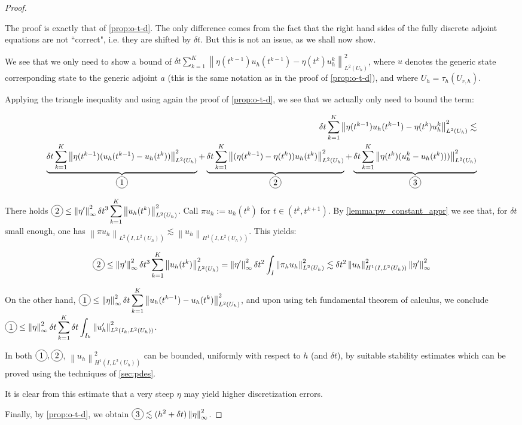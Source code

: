 \documentclass[english,a4paper,9pt,oneside]{scrbook}	%
\theoremstyle{break}
\newenvironment{mproof}[1][\proofname]{%
  \begin{proof}[#1]$ $\par\nobreak\ignorespaces
}{%
  \end{proof}
}
\renewcommand*{\proofname}{Proof}
\theoremstyle{remark}
\newcommand{\ds}{\displaystyle}
\newcommand{\norm}[1]{\left\lVert#1\right\rVert}
\newcommand*\circled[1]{\tikz[baseline=(char.base)]{
            \node[shape=circle,draw,inner sep=2pt] (char) {#1};}}
\begin{document}
\begin{mproof}
The proof is exactly that of \cref{prop:o-t-d}. The only difference comes from the fact that the right hand sides of the fully discrete adjoint equations are not ``correct", i.e. they are shifted by $\delta t$. But this is not an issue, as we shall now show. 

We see that we only need to show a bound of  $\delta t \sum_{k=1}^{K}\norm{\eta(t^{k-1})u_h(t^{k-1})-\eta(t^k)u_h^{k}}^2_{L^2(U_h)}$, where $u$ denotes the generic state corresponding state to the generic adjoint $a$ (this is the same notation as in the proof of \cref{prop:o-t-d}), and where $U_h=\tau_h(U_{r,h})$.

Applying the triangle inequality and using again the proof of \cref{prop:o-t-d}, we see that we actually only need to bound the term:

\begin{align*}
\delta t \sum_{k=1}^{K}\norm{\eta(t^{k-1})u_h(t^{k-1})-\eta(t^k)u_h^k}^2_{L^2(U_h)}\lesssim\\
\underbrace{\delta t \sum_{k=1}^{K}\norm{\eta(t^{k-1})(u_h(t^{k-1})-u_h(t^{k}))}^2_{L^2(U_h)}}_{\circled{1}}+
\underbrace{\delta t \sum_{k=1}^{K}\norm{(\eta(t^{k-1})-\eta(t^k))u_h(t^{k})}^2_{L^2(U_h)}}_{\circled{2}}+
\underbrace{\delta t \sum_{k=1}^{K}\norm{\eta(t^k)(u_h^k-u_h(t^k)))}^2_{L^2(U_h)}}_{\circled{3}}
\end{align*}

There holds $\ds  \circled{2} \leq \norm{\eta'}_\infty^2 \delta t^3 \sum_{k=1}^{K}\norm{u_h(t^{k})}^2_{L^2(U_h)}$. Call $\pi u_h := u_h(t^{k})$ for $t \in (t^k, t^{k+1})$. By \cref{lemma:pw_constant_appr} we see that, for $\delta t $ small enough, one has $\norm{\pi u_h}_{L^2(I, L^2(U_h))} \lesssim \norm{u_h}_{H^1(I,L^2(U_h))}$. This yields:

\begin{align*}
	 \ds  \circled{2}\leq \norm{\eta'}_\infty^2 \delta t^3 \sum_{k=1}^{K}\norm{u_h(t^{k})}^2_{L^2(U_h)}  = \norm{\eta'}_\infty^2 \delta t^2 \int_I \norm{\pi_h u_h}^2_{L^2(U_h)}\lesssim \delta t^2 \norm{u_h}_{H^1(I,L^2(U_h))}^2 \norm{\eta'}_\infty ^2
\end{align*}

On the other hand,  $\ds  \circled{1} \leq \norm{\eta}_\infty^2 \delta t \sum_{k=1}^{K}\norm{u_h(t^{k-1})-u_h(t^{k})}^2_{L^2(U_h)}$, and upon using teh fundamental theorem of calculus, we conclude $\ds \circled{1} \leq \norm{\eta}_\infty^2 \delta t \sum_{k=1}^{K} \delta t \int_{I_k}\norm{u_h'}_{L^2(I_k , L^2(U_h))}^2$.

In both $\circled{1},\circled{2}$, $\norm{u_h}_{H^1(I,L^2(U_h))}^2$ can be bounded, uniformly with respect to $h$ (and $\delta t$), by suitable stability estimates which can be proved using the techniques of \cref{sec:pdes}.

It is clear from this estimate that a very steep $\eta$ may yield higher discretization errors.

Finally, by \cref{prop:o-t-d}, we obtain $\ds \circled{3} \lesssim (h^2+\delta t)\norm{\eta}_\infty^2 $.
\end{mproof}
\end{document}
